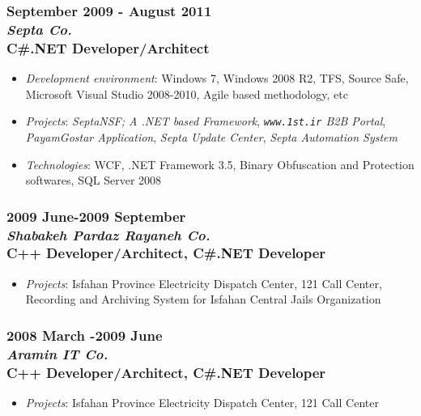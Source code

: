 \documentclass[10pt,a4paper]{article}
\begin{document}
\subsubsection{\textnormal {September 2009 - August 2011} \\ \textnormal {\textit {Septa Co.}} \\ C\#.NET Developer/Architect}
  \setlength{\leftskip}{0.5cm}
  \setlength{\rightskip}{1cm}
  \begin{itemize}
    \setlength{\rightskip}{1cm}
    \setlength\itemsep{0em}
    \item \small \textit {Development environment}: Windows 7, Windows 2008 R2, TFS, Source Safe, Microsoft Visual Studio 2008-2010, Agile based methodology, etc
    \item \small \textit {Projects}: \textit{SeptaNSF; A .NET based Framework}, \textit{\texttt{www.1st.ir} B2B Portal}, \textit{PayamGostar Application}, \textit{Septa Update Center}, \textit{Septa Automation System}
    \item \small \textit {Technologies}: WCF, .NET Framework 3.5, Binary Obfuscation and Protection softwares, SQL Server 2008
  \end{itemize}
  \setlength{\leftskip}{0pt}
  \setlength{\rightskip}{0cm}

\subsubsection{\textnormal {2009 June-2009 September} \\ \textnormal {\textit {Shabakeh Pardaz Rayaneh Co.}} \\ C++ Developer/Architect, C\#.NET Developer}
  \setlength{\leftskip}{0.5cm}
  \setlength{\rightskip}{1cm}
	\begin{itemize}
	  \setlength{\rightskip}{1cm}
    \setlength\itemsep{0em}
    \item \small \textit{Projects}: Isfahan Province Electricity Dispatch Center, 121 Call Center, Recording and Archiving System for Isfahan Central Jails Organization
	\end{itemize}
	\setlength{\leftskip}{0pt}
  \setlength{\rightskip}{0cm}
		
\subsubsection{\textnormal {2008 March -2009 June} \\ \textnormal {\textit {Aramin IT Co.}} \\ C++ Developer/Architect, C\#.NET Developer}
  \setlength{\leftskip}{0.5cm}
  \setlength{\rightskip}{1cm}
  \begin{itemize}
    \setlength{\rightskip}{1cm}
    \setlength\itemsep{0em}
    \item \small \textit{Projects}: Isfahan Province Electricity Dispatch Center, 121 Call Center
	\end{itemize}
  \setlength{\leftskip}{0pt}
  \setlength{\rightskip}{0cm}
\end{document}
